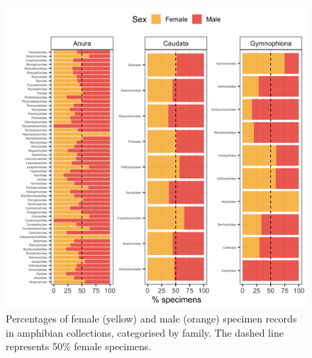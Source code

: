 \documentclass[a4paper, 12pt]{article}
\begin{document}
\begin{figure}[H]
 \centering
  \includegraphics[width = \linewidth]{figures/all-family-amphibians.png}
  \caption{Percentages of female (yellow) and male (orange) specimen records in amphibian collections, categorised by family.
  The dashed line represents 50\% female specimens.}
  \label{fig-amphibian-family}
\end{figure}

\newpage
\end{document}
